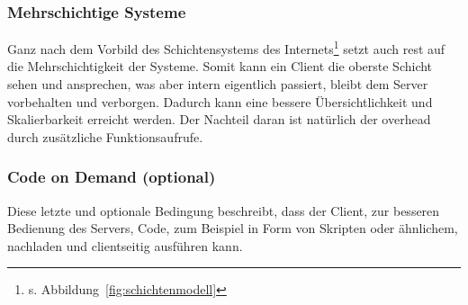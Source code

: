 	\subsubsection{Mehrschichtige Systeme}
		Ganz nach dem Vorbild des Schichtensystems des Internets\footnote{s. Abbildung~\ref{fig:schichtenmodell}}
		setzt auch \gls{rest} auf die Mehrschichtigkeit der Systeme.
		Somit kann ein Client die oberste Schicht sehen und ansprechen,
		was aber intern eigentlich passiert,
		bleibt dem Server vorbehalten und verborgen.
		Dadurch kann eine bessere Übersichtlichkeit und Skalierbarkeit erreicht werden.
		Der Nachteil daran ist natürlich der \gls{overhead} durch zusätzliche Funktionsaufrufe.

	\subsubsection{Code on Demand (optional)}
		Diese letzte und optionale Bedingung beschreibt,
		dass der Client, zur besseren Bedienung des Servers,
		Code, zum Beispiel in Form von Skripten oder ähnlichem,
		nachladen und clientseitig ausführen kann.